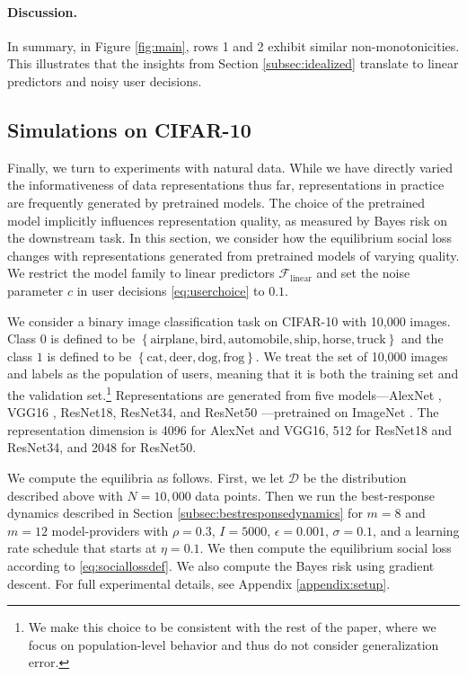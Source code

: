 \documentclass[letterpaper,11pt]{article}
\theoremstyle{plain}
\begin{document}
\paragraph{Discussion.}
In summary, in Figure \ref{fig:main}, rows 1 and 2  exhibit similar non-monotonicities. This illustrates that the insights from Section \ref{subsec:idealized} translate to linear predictors and noisy user decisions. 

\subsection{Simulations on CIFAR-10}\label{subsec:image}

Finally, we turn to experiments with natural data. While we have directly varied the informativeness of data representations thus far, representations in practice are frequently generated by pretrained models. The choice of the pretrained model implicitly influences representation quality, as measured by Bayes risk on the downstream task. In this section, we consider how the equilibrium social loss changes with representations generated from pretrained models of varying quality. We restrict the model family to linear predictors $\mathcal{F}_{\text{linear}}$ and set the noise parameter $c$ in user decisions \eqref{eq:userchoice} to $0.1$.

We consider a binary image classification task on CIFAR-10 \citep{CIFAR} with 10,000 images. Class $0$ is defined to be $\left\{\text{airplane}, \text{bird}, \text{automobile}, \text{ship}, \text{horse}, \text{truck}\right\}$ and the class $1$ is defined to be $\left\{\text{cat}, \text{deer}, \text{dog}, \text{frog}\right\}$. We treat the set of 10,000 images and labels as the population of users, meaning that it is both the training set and the validation set.\footnote{We make this choice to be consistent with the rest of the paper, where we focus on population-level behavior and thus do not consider  generalization error.} Representations are generated from five models---AlexNet \citep{AlexNet}, VGG16 \citep{VGGref}, ResNet18, ResNet34, and ResNet50 \citep{ResNet}---pretrained on ImageNet \citep{ImageNet}. The representation dimension is 4096 for AlexNet and VGG16, 512 for ResNet18 and ResNet34, and 2048 for ResNet50. 

We compute the equilibria as follows. First, we let $\mathcal{D}$ be the distribution described above with $N = 10,000$ data points. Then we run the best-response dynamics described in Section \ref{subsec:bestresponsedynamics} for $m = 8$ and $m = 12$ model-providers with $\rho = 0.3$, $I = 5000$, $\epsilon = 0.001$, $\sigma = 0.1$, and a learning rate schedule that starts at $\eta = 0.1$. We then compute the equilibrium social loss according to \eqref{eq:sociallossdef}.  We also compute the Bayes risk using gradient descent. For full experimental details, see Appendix \ref{appendix:setup}.  
\end{document}
